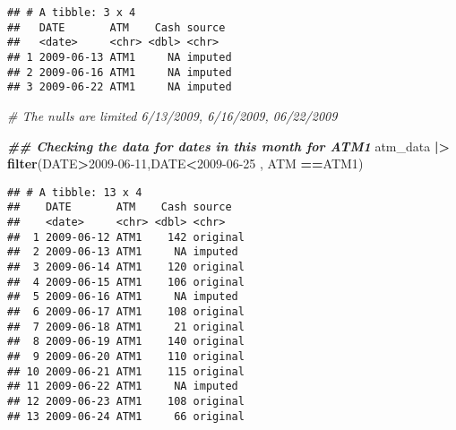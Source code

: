 \documentclass[
]{article}
\newenvironment{Shaded}{\begin{snugshade}}{\end{snugshade}}
\newcommand{\CommentTok}[1]{\textcolor[rgb]{0.56,0.35,0.01}{\textit{#1}}}
\newcommand{\DocumentationTok}[1]{\textcolor[rgb]{0.56,0.35,0.01}{\textbf{\textit{#1}}}}
\newcommand{\FunctionTok}[1]{\textcolor[rgb]{0.13,0.29,0.53}{\textbf{#1}}}
\newcommand{\NormalTok}[1]{#1}
\newcommand{\SpecialCharTok}[1]{\textcolor[rgb]{0.81,0.36,0.00}{\textbf{#1}}}
\newcommand{\StringTok}[1]{\textcolor[rgb]{0.31,0.60,0.02}{#1}}
\begin{document}
\begin{verbatim}
## # A tibble: 3 x 4
##   DATE       ATM    Cash source 
##   <date>     <chr> <dbl> <chr>  
## 1 2009-06-13 ATM1     NA imputed
## 2 2009-06-16 ATM1     NA imputed
## 3 2009-06-22 ATM1     NA imputed
\end{verbatim}

\begin{Shaded}
\begin{Highlighting}[]
\CommentTok{\# The nulls are limited 6/13/2009, 6/16/2009, 06/22/2009}

\DocumentationTok{\#\# Checking the data for dates in this month for ATM1}
\NormalTok{atm\_data }\SpecialCharTok{|\textgreater{}} \FunctionTok{filter}\NormalTok{(DATE}\SpecialCharTok{\textgreater{}}\StringTok{\textquotesingle{}2009{-}06{-}11\textquotesingle{}}\NormalTok{,DATE}\SpecialCharTok{\textless{}}\StringTok{\textquotesingle{}2009{-}06{-}25\textquotesingle{}}\NormalTok{ , ATM }\SpecialCharTok{==}\StringTok{\textquotesingle{}ATM1\textquotesingle{}}\NormalTok{)}
\end{Highlighting}
\end{Shaded}

\begin{verbatim}
## # A tibble: 13 x 4
##    DATE       ATM    Cash source  
##    <date>     <chr> <dbl> <chr>   
##  1 2009-06-12 ATM1    142 original
##  2 2009-06-13 ATM1     NA imputed 
##  3 2009-06-14 ATM1    120 original
##  4 2009-06-15 ATM1    106 original
##  5 2009-06-16 ATM1     NA imputed 
##  6 2009-06-17 ATM1    108 original
##  7 2009-06-18 ATM1     21 original
##  8 2009-06-19 ATM1    140 original
##  9 2009-06-20 ATM1    110 original
## 10 2009-06-21 ATM1    115 original
## 11 2009-06-22 ATM1     NA imputed 
## 12 2009-06-23 ATM1    108 original
## 13 2009-06-24 ATM1     66 original
\end{verbatim}
\end{document}
